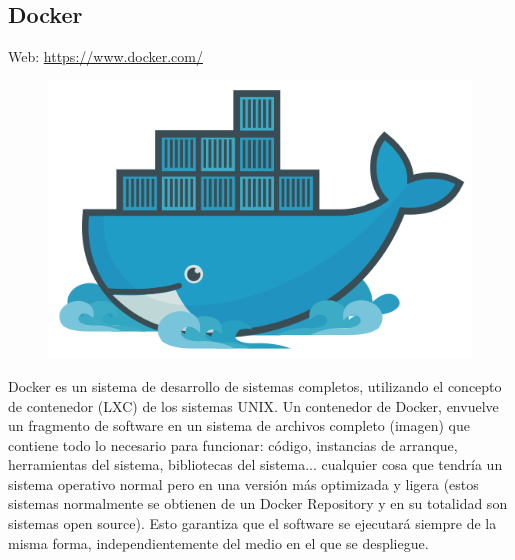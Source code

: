 \subsection{Docker}
Web: \url{https://www.docker.com/}\\
\begin{figure}[H]
  \begin{center}
    \includegraphics[scale=0.5]{diagramas/docker-logo.png}
  \end{center}
\end{figure}

Docker es un sistema de desarrollo de sistemas completos, utilizando el concepto de contenedor (LXC) de los sistemas UNIX. Un contenedor de Docker, envuelve un fragmento de software en un sistema de archivos completo (imagen) que contiene todo lo necesario para funcionar: código, instancias de arranque, herramientas del sistema, bibliotecas del sistema... cualquier cosa que tendría un sistema operativo normal pero en una versión más optimizada y ligera (estos sistemas normalmente se obtienen de un Docker Repository y en su totalidad son sistemas open source). Esto garantiza que el software se ejecutará siempre de la misma forma, independientemente del medio en el que se despliegue.\\

